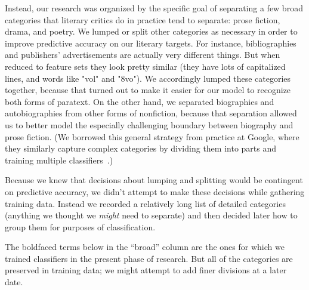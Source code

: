 \documentclass[paper=a4, fontsize=12pt]{scrartcl}
\numberwithin{equation}{section}		%
\numberwithin{figure}{section}			%
\numberwithin{table}{section}				%
\begin{document}
Instead, our research was organized by the specific goal of separating a few broad categories that literary critics do in practice tend to separate: prose fiction, drama, and poetry. We lumped or split other categories as necessary in order to improve predictive accuracy on our literary targets. For instance, bibliographies and publishers' advertisements are actually very different things. But when reduced to feature sets they look pretty similar (they have lots of capitalized lines, and words like "vol" and "8vo"). We accordingly lumped these categories together, because that turned out to make it easier for our model to recognize both forms of paratext. On the other hand, we separated biographies and autobiographies from other forms of nonfiction, because that separation allowed us to better model the especially challenging boundary between biography and prose fiction. (We borrowed this general strategy from practice at Google, where they similarly capture complex categories by dividing them into parts and training multiple classifiers~\cite{sculley:adversarial}.) 

Because we knew that decisions about lumping and splitting would be contingent on predictive accuracy, we didn't attempt to make these decisions while gathering training data. Instead we recorded a relatively long list of detailed categories (anything we thought we \textit{might} need to separate) and then decided later how to group them for purposes of classification.

The boldfaced terms below in the ``broad'' column are the ones for which we trained classifiers in the present phase of research. But all of the categories are preserved in training data; we might attempt to add finer divisions at a later date.
\end{document}
